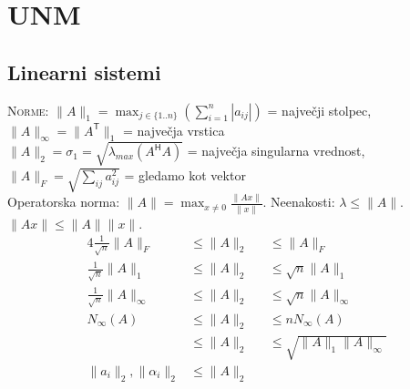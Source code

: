 \documentclass[a4paper,10pt]{article}
\theoremstyle{definition}
\newcommand{\T}{\mathsf{T}\!}
\renewcommand{\H}{\mathsf{H}\!}
\begin{document}
%
%


\section*{UNM}
\subsection*{Linearni sistemi}

\textsc{Norme:} $\|A\|_1 =
\max_{j\in\{1..n\}}\left(\sum_{i=1}^n|a_{ij}|\right)$ = največji stolpec,
$\|A\|_\infty = \|A^\T\|_1$ = največja vrstica \\
$\|A\|_2 = \sigma_1 = \sqrt{\lambda_{max}(A^\H A)}$ = največja singularna vrednost,
$\|A\|_F = \sqrt{\sum_{ij}a_{ij}^2}$ = gledamo kot vektor \\
Operatorska norma: $\|A\| = \max_{x\neq 0}\frac{\|Ax\|}{\|x\|}$.
Neenakosti: $\lambda \leq \|A\|$. $\|Ax\| \leq \|A\|\|x\|$.
\begin{alignat*}{4}
\textstyle \frac{1}{\sqrt{n}}\|A\|_F &\leq \|A\|_2 &&\leq \|A\|_F \\
\textstyle \frac{1}{\sqrt{n}}\|A\|_1 &\leq \|A\|_2 &&\leq \sqrt{n} \|A\|_1 \\
\textstyle \frac{1}{\sqrt{n}}\|A\|_\infty &\leq \|A\|_2 &&\leq \sqrt{n} \|A\|_\infty \\
N_\infty(A) &\leq \|A\|_2 &&\leq nN_\infty(A) \\
            &\leq \|A\|_2 &&\leq \sqrt{\|A\|_1\|A\|_\infty} \\
\|a_i\|_2, \|\alpha_i\|_2 &\leq \|A\|_2 &&
\end{alignat*}
\end{document}
